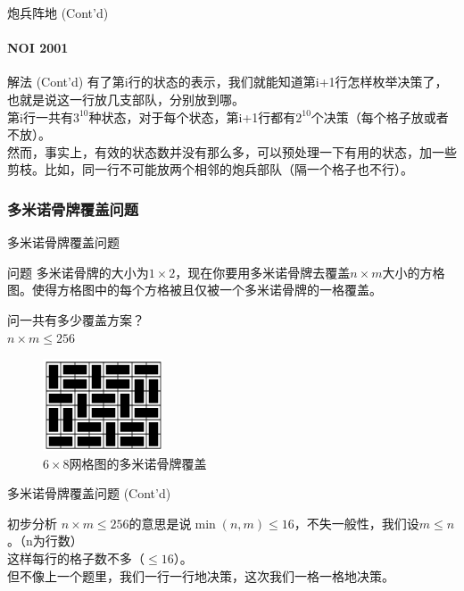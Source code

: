 \documentclass[hyperref={unicode=true}]{beamer}
\theoremstyle{definition}
\theoremstyle{proof}
\begin{document}
\begin{frame}{炮兵阵地 (Cont'd)}\framesubtitle{NOI 2001}
  \begin{exampleblock}{解法 (Cont'd)}
    有了第i行的状态的表示，我们就能知道第i+1行怎样枚举决策了，也就是说这一行放几支部队，分别放到哪。\\
    \pause{}第i行一共有$3^{10}$种状态，对于每个状态，第i+1行都有$2^{10}$个决策（每个格子放或者不放）。\\
    然而，事实上，有效的状态数并没有那么多，可以预处理一下有用的状态，加一些剪枝。比如，同一行不可能放两个相邻的炮兵部队（隔一个格子也不行）。
  \end{exampleblock}
\end{frame}

\subsubsection{多米诺骨牌覆盖问题}
\begin{frame}{多米诺骨牌覆盖问题}
  \begin{block}{问题}
    多米诺骨牌的大小为$1\times 2$，现在你要用多米诺骨牌去覆盖$n\times m$大小的方格图。使得方格图中的每个方格被且仅被一个多米诺骨牌的一格覆盖。\\
    \begin{minipage}{0.45\linewidth}
      问一共有多少覆盖方案？\\
      $n \times m \leq 256$
    \end{minipage}
    \begin{minipage}{0.45\linewidth}
      \begin{figure}
        \centering
        \includegraphics[width=1.4in]{figures/domino.png}
        \caption{$6\times 8$网格图的多米诺骨牌覆盖}
      \end{figure}
    \end{minipage}
  \end{block}
\end{frame}

\begin{frame}{多米诺骨牌覆盖问题 (Cont'd)}
  \begin{alertblock}{初步分析}
    $n \times m \leq 256$的意思是说$\min{(n,m)} \leq 16$，不失一般性，我们设$m\leq n$。（n为行数）\\
    这样每行的格子数不多（$\leq 16$）。\\
    但不像上一个题里，我们一行一行地决策，这次我们一格一格地决策。
  \end{alertblock}
\end{frame}
\end{document}
